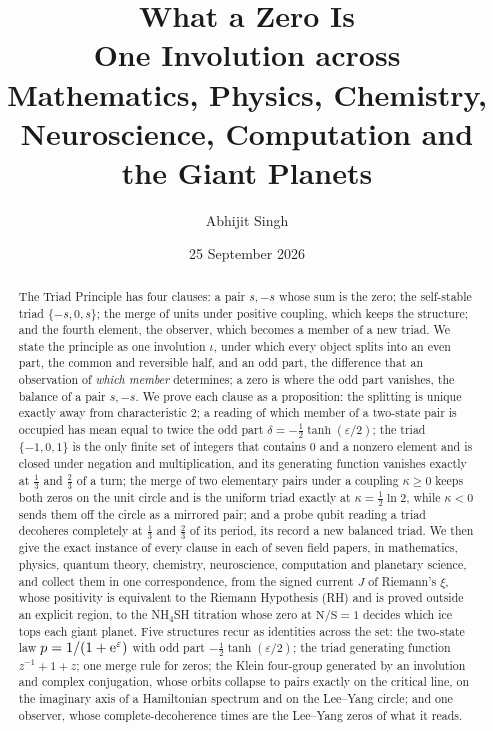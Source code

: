 \documentclass[11pt]{article}
\title{\textbf{What a Zero Is}\\[4pt]
\large One Involution across Mathematics, Physics, Chemistry, Neuroscience, Computation and the Giant Planets}
\author{Abhijit Singh}
\date{25 September 2026}
\theoremstyle{definition}\newtheorem{definition}[theorem]{Definition}
\theoremstyle{remark}\newtheorem{remark}[theorem]{Remark}
\begin{document}
\maketitle
\begin{abstract}
The Triad Principle has four clauses: a pair $s,-s$ whose sum is the zero; the self-stable triad $\{-s,0,s\}$; the merge of units under positive coupling, which keeps the structure; and the fourth element, the observer, which becomes a member of a new triad. We state the principle as one involution $\iota$, under which every object splits into an even part, the common and reversible half, and an odd part, the difference that an observation of \emph{which member} determines; a zero is where the odd part vanishes, the balance of a pair $s,-s$. We prove each clause as a proposition: the splitting is unique exactly away from characteristic $2$; a reading of which member of a two-state pair is occupied has mean equal to twice the odd part $\delta=-\frac12\tanh(\varepsilon/2)$; the triad $\{-1,0,1\}$ is the only finite set of integers that contains $0$ and a nonzero element and is closed under negation and multiplication, and its generating function vanishes exactly at $\frac13$ and $\frac23$ of a turn; the merge of two elementary pairs under a coupling $\kappa\ge0$ keeps both zeros on the unit circle and is the uniform triad exactly at $\kappa=\frac12\ln2$, while $\kappa<0$ sends them off the circle as a mirrored pair; and a probe qubit reading a triad decoheres completely at $\frac13$ and $\frac23$ of its period, its record a new balanced triad. We then give the exact instance of every clause in each of seven field papers, in mathematics, physics, quantum theory, chemistry, neuroscience, computation and planetary science, and collect them in one correspondence, from the signed current $J$ of Riemann's $\xi$, whose positivity is equivalent to the Riemann Hypothesis (RH) and is proved outside an explicit region, to the NH$_4$SH titration whose zero at $\mathrm{N/S}=1$ decides which ice tops each giant planet. Five structures recur as identities across the set: the two-state law $p=1/(1+\mathrm e^{\varepsilon})$ with odd part $-\frac12\tanh(\varepsilon/2)$; the triad generating function $z^{-1}+1+z$; one merge rule for zeros; the Klein four-group generated by an involution and complex conjugation, whose orbits collapse to pairs exactly on the critical line, on the imaginary axis of a Hamiltonian spectrum and on the Lee--Yang circle; and one observer, whose complete-decoherence times are the Lee--Yang zeros of what it reads.


\end{abstract}
\end{document}
